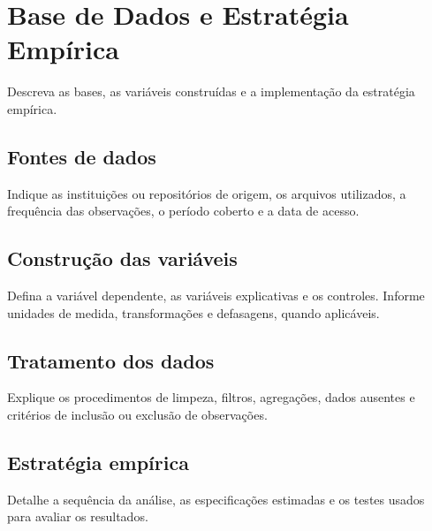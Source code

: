 \chapter{Base de Dados e Estratégia Empírica}

Descreva as bases, as variáveis construídas e a implementação da estratégia
empírica.

\section{Fontes de dados}

Indique as instituições ou repositórios de origem, os arquivos utilizados, a
frequência das observações, o período coberto e a data de acesso.

\section{Construção das variáveis}

Defina a variável dependente, as variáveis explicativas e os controles. Informe
unidades de medida, transformações e defasagens, quando aplicáveis.

\section{Tratamento dos dados}

Explique os procedimentos de limpeza, filtros, agregações, dados ausentes e
critérios de inclusão ou exclusão de observações.

\section{Estratégia empírica}

Detalhe a sequência da análise, as especificações estimadas e os testes usados
para avaliar os resultados.

